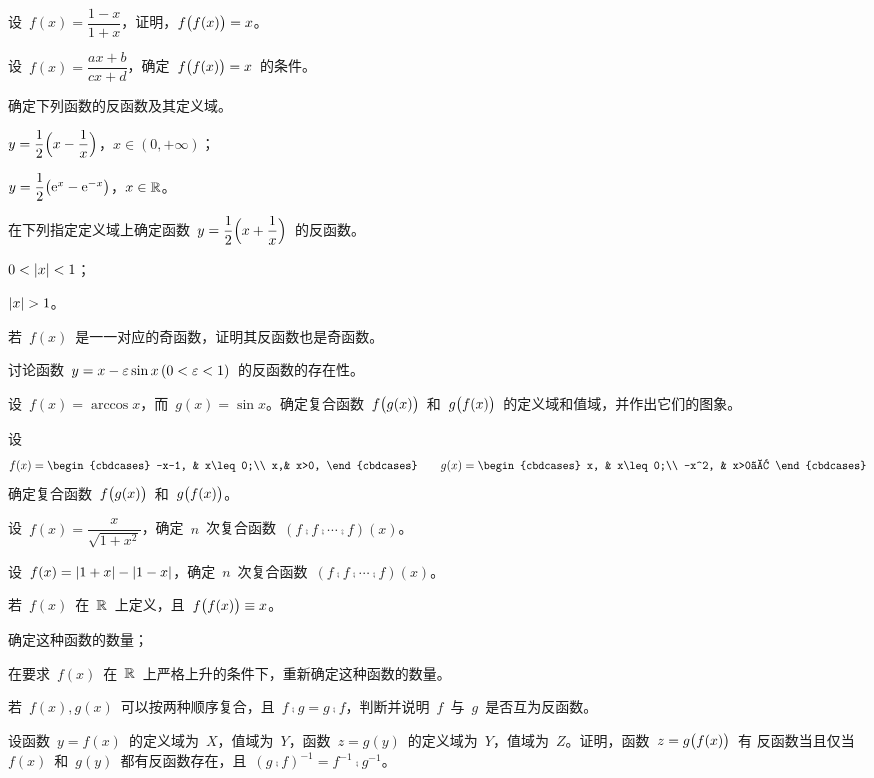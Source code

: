 \begin{exercise}
\item 设~$f(x)=\dfrac{1-x}{1+x}$，证明，$f\Parenb{f(x)}=x$。
\item 设~$f(x)=\dfrac{ax+b}{cx+d}$，确定~$f\Parenb{f(x)}=x$~的条件。
\item 确定下列函数的反函数及其定义域。
\begin{exlistcols}
  \item $\dps y=\frac12\Paren[\Big]{x-\frac 1x}$，\enspace$x\in(0,+\infty)$；
  \item $y=\dfrac12\Parenb{\me^x-\me^{-x}}$，\enspace$x\in\FR$。
\end{exlistcols}
\item 在下列指定定义域上确定函数~$\dps y=\frac12\Paren[\Big]{x+\frac1x}$~的反函数。
\begin{exlistcols}
  \item $0<\abs x<1$；
  \item $\abs x>1$。
\end{exlistcols}
\item 若~$f(x)$~是一一对应的奇函数，证明其反函数也是奇函数。
\item 讨论函数~$y=x-\e\sin x\,(0<\e<1)$~的反函数的存在性。
\item 设~$f(x)=\arccos x$，而~$g(x)=\sin x$。确定复合函数~$f\Parenb{g(x)}$~和~$g\Parenb{f(x)}$~的定义域和值域，并作出它们的图象。
\item 设
\[
  f(x)=\begin{cbdcases}
    -x-1, & x\leq0;\\
    x,& x>0,
  \end{cbdcases}\qquad
  g(x)=\begin{cbdcases}
    x,    & x\leq0;\\
    -x^2, & x>0。
  \end{cbdcases}
\]
确定复合函数~$f\Parenb{g(x)}$~和~$g\Parenb{f(x)}$。
\item 设~$f(x)=\dfrac x{\sqrt{1+x^2}}$，确定~$n$~次复合函数~$(f\comp f\comp\dotsb\comp f)(x)$。
\item 设~$f(x)=\abs{1+x}-\abs{1-x}$，确定~$n$~次复合函数~$(f\comp f\comp\dotsb\comp f)(x)$。
\item 若~$f(x)$~在~$\FR$~上定义，且~$f\Parenb{f(x)}\equiv x$。
\begin{exlistcols}
  \item 确定这种函数的数量；
  \item 在要求~$f(x)$~在~$\FR$~上严格上升的条件下，重新确定这种函数的数量。
\end{exlistcols}
\item 若~$f(x),g(x)$~可以按两种顺序复合，且~$f\comp g=g\comp f$，判断并说明~$f$~与~$g$~是否互为反函数。
\item 设函数~$y=f(x)$~的定义域为~$X$，值域为~$Y$，函数~$z=g(y)$~的定义域为~$Y$，值域为~$Z$。证明，函数~$z=g\Parenb{f(x)}$~有
反函数当且仅当~$f(x)$~和~$g(y)$~都有反函数存在，且~$(g\comp f)^{-1}=f^{-1}\comp g^{-1}$。
\end{exercise}


